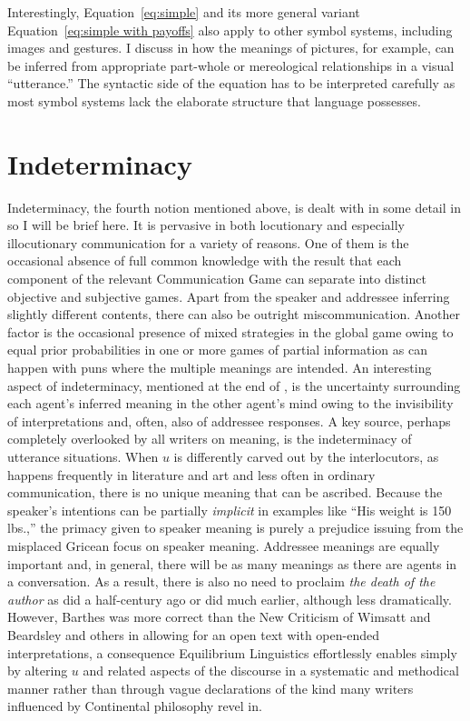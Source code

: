 Interestingly, Equation~\ref{eq:simple} and its more general variant Equation~\ref{eq:simple with payoffs} also apply to other symbol systems, including images and gestures. I discuss in \citet[Section~7.5]{parikh:le} how the meanings of pictures, for example, can be inferred from appropriate part-whole or mereological relationships in a visual ``utterance.'' The syntactic side of the equation has to be interpreted carefully as most symbol systems lack the elaborate structure that language possesses.

\section{Indeterminacy} \label{sec:indeterminacy}
Indeterminacy, the fourth notion mentioned above, is dealt with in some detail in \citet[Chapter~5]{parikh:le} so I will be brief here. It is pervasive in both locutionary and especially illocutionary communication for a variety of reasons. One of them is the occasional absence of full common knowledge with the result that each component of the relevant Communication Game can separate into distinct objective and subjective games. Apart from the speaker and addressee inferring slightly different contents, there can also be outright miscommunication. Another factor is the occasional presence of mixed strategies in the global game owing to equal prior probabilities in one or more games of partial information as can happen with puns where the multiple meanings are intended. An interesting aspect of indeterminacy, mentioned at the end of , is the uncertainty surrounding each agent's inferred meaning in the other agent's mind owing to the invisibility of interpretations and, often, also of addressee responses. A key source, perhaps completely overlooked by all writers on meaning, is the indeterminacy of utterance situations. When $u$ is differently carved out by the interlocutors, as happens frequently in literature and art and less often in ordinary communication, there is no unique meaning that can be ascribed. Because the speaker's intentions can be partially \emph{implicit} in examples like ``His weight is 150 lbs.,'' the primacy given to speaker meaning is purely a prejudice issuing from the misplaced Gricean  focus on speaker meaning. Addressee meanings are equally important and, in general, there will be as many meanings as there are agents in a conversation. As a result, there is also no need to proclaim \emph{the death of the author} as \citet{barthes:da} did a half-century ago or \citet{wb:if} did much earlier, although less dramatically. However, Barthes was more correct than the New Criticism of Wimsatt and Beardsley and others in allowing for an open text with open-ended interpretations, a consequence Equilibrium Linguistics effortlessly enables simply by altering $u$ and related aspects of the discourse in a systematic and methodical manner rather than through vague declarations of the kind many writers influenced by Continental philosophy revel in.

